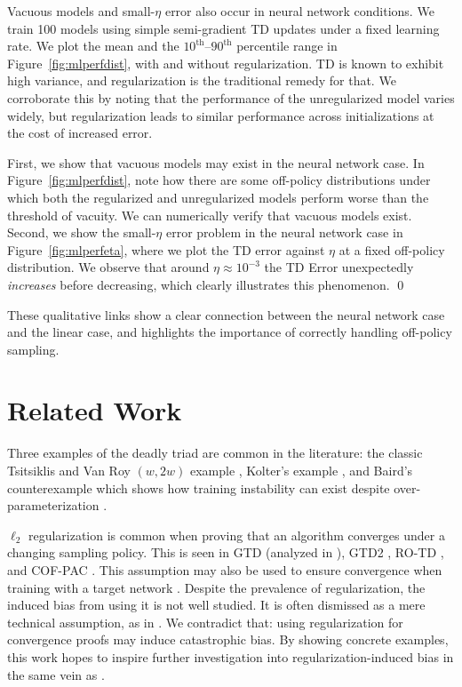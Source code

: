 \begin{example}
  Vacuous models and small-$\eta$ error also occur in neural network conditions.
  \label{ex:neuralnetwork}
  \vspace{-1.25em}\proof
  We train 100 models using simple semi-gradient TD updates under a fixed learning rate. We plot the mean and the $10^\text{th}$--$90^\text{th}$ percentile range in Figure~\ref{fig:mlperfdist}, with and without regularization.
  TD is known to exhibit high variance, and regularization is the traditional remedy for that. We corroborate this by noting that the performance of the unregularized model varies widely, but regularization leads to similar performance across initializations at the cost of increased error.

  First, we show that vacuous models may exist in the neural network case. In Figure~\ref{fig:mlperfdist}, note how there are some off-policy distributions under which both the regularized and unregularized models perform worse than the threshold of vacuity. We can numerically verify that vacuous models exist. Second, we show the small-$\eta$ error problem in the neural network case in Figure~\ref*{fig:mlperfeta}, where we plot the TD error against $\eta$ at a fixed off-policy distribution. We observe that around $\eta\approx 10^{-3}$ the TD Error unexpectedly \emph{increases} before decreasing, which clearly illustrates this phenomenon.  \qed
\end{example}

These qualitative links show a clear connection between the neural network case and the linear case, and highlights the importance of correctly handling off-policy sampling.


\section{Related Work}
\label{sec:relatedwork}
Three examples of the deadly triad are common in the literature: the classic Tsitsiklis and Van Roy $(w, 2w)$ example \cite[p.~260]{sutton2020reinforcement}, Kolter's example \cite{kolter2011fixed}, and Baird's counterexample which shows how training instability can exist despite over-parameterization \cite{baird1993counterexample}.

$\ell_2$ regularization is common when proving that an algorithm converges under a changing sampling policy. This is seen in GTD (analyzed in \cite{yu2017convergence}), GTD2 \cite{sutton2009fast}, RO-TD \cite{mahadevan2014proximal}, and COF-PAC \cite{zhang2020provably}. This assumption may also be used to ensure convergence when training with a target network \cite{zhang2021breaking}. Despite the prevalence of regularization, the induced bias from using it is not well studied. It is often dismissed as a mere technical assumption, as in \cite{diddigi2019convergent}. We contradict that: using regularization for convergence proofs may induce catastrophic bias. By showing concrete examples, this work hopes to inspire further investigation into regularization-induced bias in the same vein as \cite{yu2017convergence}.

